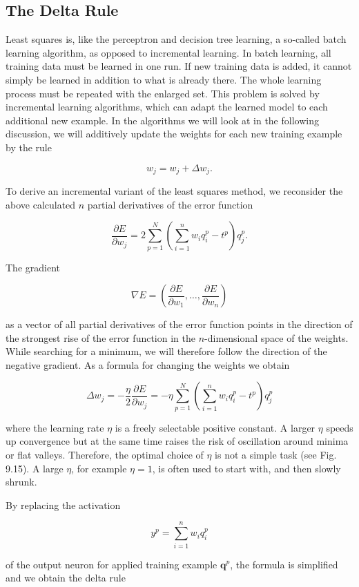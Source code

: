\documentclass[10pt]{book}
\begin{document}
\subsection{The Delta Rule}
Least squares is, like the perceptron and decision tree learning, a so-called batch learning algorithm, as opposed to incremental learning. In batch learning, all training data must be learned in one run. If new training data is added, it cannot simply be learned in addition to what is already there. The whole learning process must be repeated with the enlarged set. This problem is solved by incremental learning algorithms, which can adapt the learned model to each additional new example. In the algorithms we will look at in the following discussion, we will additively update the weights for each new training example by the rule

$$
w_{j}=w_{j}+\Delta w_{j} .
$$

To derive an incremental variant of the least squares method, we reconsider the above calculated $n$ partial derivatives of the error function

$$
\frac{\partial E}{\partial w_{j}}=2 \sum_{p=1}^{N}\left(\sum_{i=1}^{n} w_{i} q_{i}^{p}-t^{p}\right) q_{j}^{p} .
$$

The gradient

$$
\nabla E=\left(\frac{\partial E}{\partial w_{1}}, \ldots, \frac{\partial E}{\partial w_{n}}\right)
$$

as a vector of all partial derivatives of the error function points in the direction of the strongest rise of the error function in the $n$-dimensional space of the weights. While searching for a minimum, we will therefore follow the direction of the negative gradient. As a formula for changing the weights we obtain

$$
\Delta w_{j}=-\frac{\eta}{2} \frac{\partial E}{\partial w_{j}}=-\eta \sum_{p=1}^{N}\left(\sum_{i=1}^{n} w_{i} q_{i}^{p}-t^{p}\right) q_{j}^{p}
$$

where the learning rate $\eta$ is a freely selectable positive constant. A larger $\eta$ speeds up convergence but at the same time raises the risk of oscillation around minima or flat valleys. Therefore, the optimal choice of $\eta$ is not a simple task (see Fig. 9.15). A large $\eta$, for example $\eta=1$, is often used to start with, and then slowly shrunk.

By replacing the activation

$$
y^{p}=\sum_{i=1}^{n} w_{i} q_{i}^{p}
$$

of the output neuron for applied training example $\boldsymbol{q}^{p}$, the formula is simplified and we obtain the delta rule
\end{document}

